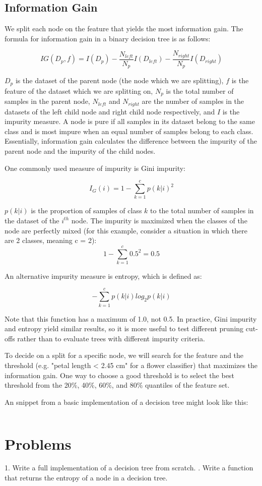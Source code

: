 \documentclass{article}
\begin{document}
\subsection{Information Gain}
We split each node on the feature that yields the most information gain. The formula for information gain in a binary decision tree is as follows:

\[IG(D_p, f) = I(D_p) - \frac{N_{left}}{N_p}I(D_{left}) - \frac{N_{right}}{N_p}I(D_{right}) \]

$D_p$ is the dataset of the parent node (the node which we are splitting), $f$ is the feature of the dataset which we are splitting on, $N_p$ is the total number of samples in the parent node, $N_{left}$ and $N_{right}$ are the number of samples in the datasets of the left child node and right child node respectively, and $I$ is the impurity measure. A node is pure if all samples in its dataset belong to the same class and is most impure when an equal number of samples belong to each class. Essentially, information gain calculates the difference between the impurity of the parent node and the impurity of the child nodes.

One commonly used measure of impurity is Gini impurity:

\[I_G(i) = 1 - \sum_{k=1}^{c} p(k|i)^2 \]

$p(k|i)$ is the proportion of samples of class \(k\) to the total number of samples in the dataset of the $i^{th}$ node.
The impurity is maximized when the classes of the node are perfectly mixed (for this example, consider a situation in which there are 2 classes, meaning c = 2):
\[1 - \sum_{k=1}^{c} 0.5^2 = 0.5\]

An alternative impurity measure is entropy, which is defined as:

\[-\sum_{k=1}^{c} p(k|i)log_2{p(k|i)} \]

Note that this function has a maximum of 1.0, not 0.5. In practice, Gini impurity and entropy yield similar results, so it is more useful to test different pruning cut-offs rather than to evaluate trees with different impurity criteria.

To decide on a split for a specific node, we will search for the feature and the threshold (e.g. "petal length < 2.45 cm" for a flower classifier) that maximizes the information gain. One way to choose a good threshold is to select the best threshold from the 20\%, 40\%, 60\%, and 80\% quantiles of the feature set. 

An snippet from a basic implementation of a decision tree might look like this:

\inputminted{python}{decisiontree.py}


\section{Problems}
1. Write a full implementation of a decision tree from scratch. . Write a function that returns the entropy of a node in a decision tree.
\end{document}
